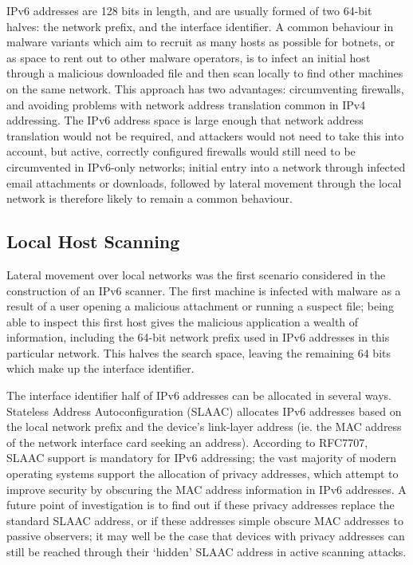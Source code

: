 \documentclass[10pt,sigconf]{acmart}
\begin{document}
IPv6 addresses are 128 bits in length, and are usually formed of two 64-bit halves: the network prefix, and the interface identifier.
A common behaviour in malware variants which aim to recruit as many hosts as possible for botnets, or as space to rent out to other malware operators, is to infect an initial host through a malicious downloaded file and then scan locally to find other machines on the same network.
This approach has two advantages: circumventing firewalls, and avoiding problems with network address translation common in IPv4 addressing.
The IPv6 address space is large enough that network address translation would not be required, and attackers would not need to take this into account, but active, correctly configured firewalls would still need to be circumvented in IPv6-only networks;
initial entry into a network through infected email attachments or downloads, followed by lateral movement through the local network is therefore likely to remain a common behaviour.

\subsection{Local Host Scanning}
Lateral movement over local networks was the first scenario considered in the construction of an IPv6 scanner.
The first machine is infected with malware as a result of a user opening a malicious attachment or running a suspect file;
being able to inspect this first host gives the malicious application a wealth of information, including the 64-bit network prefix used in IPv6 addresses in this particular network.
This halves the search space, leaving the remaining 64 bits which make up the interface identifier.

The interface identifier half of IPv6 addresses can be allocated in several ways.
Stateless Address Autoconfiguration (SLAAC) allocates IPv6 addresses based on the local network prefix and the device's link-layer address (ie. the MAC address of the network interface card seeking an address).
According to RFC7707, SLAAC support is mandatory for IPv6 addressing;
the vast majority of modern operating systems support the allocation of privacy addresses, which attempt to improve security by obscuring the MAC address information in IPv6 addresses.
A future point of investigation is to find out if these privacy addresses replace the standard SLAAC address, or if these addresses simple obscure MAC addresses to passive observers;
it may well be the case that devices with privacy addresses can still be reached through their `hidden' SLAAC address in active scanning attacks.
\end{document}
